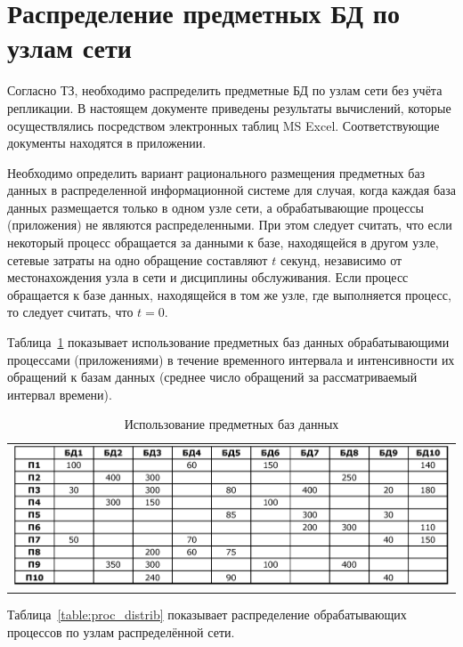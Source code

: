 \newpage

\section{Распределение предметных БД по узлам сети}

Согласно ТЗ, необходимо распределить предметные БД по узлам сети без учёта репликации. В настоящем документе приведены результаты вычислений, которые осуществлялись посредством электронных таблиц MS Excel. Соответствующие документы находятся в приложении.\par\bigskip

Необходимо определить вариант рационального размещения предметных баз данных в распределенной информационной системе для случая, когда каждая база данных размещается только в одном узле сети, а обрабатывающие процессы (приложения) не являются распределенными. При этом следует считать, что если некоторый процесс обращается за данными к базе, находящейся в другом узле, сетевые затраты на одно обращение составляют $t$ секунд, независимо от местонахождения узла в сети и дисциплины обслуживания. Если процесс обращается к базе данных, находящейся в том же узле, где выполняется процесс, то следует считать, что $t = 0$.

Таблица~\ref{table:db_usage} показывает использование предметных баз данных обрабатывающими процессами (приложениями) в течение временного интервала и интенсивности их обращений к базам данных (среднее число обращений за рассматриваемый интервал времени).

\begin{table}[h]
\caption{Использование предметных баз данных}
\label{table:db_usage}
 \begin{tabular}{c}
 \includegraphics[width=1\linewidth]{pics/pic8_1_db_usage.eps}
 \end{tabular}
\end{table}

\newpage

Таблица~\ref{table:proc_distrib} показывает распределение обрабатывающих процессов по узлам распределённой сети.

